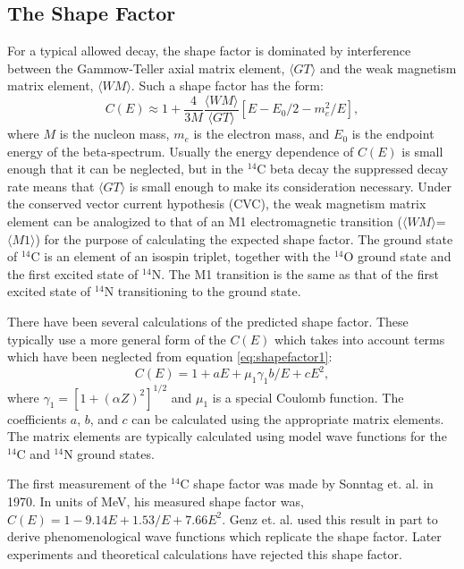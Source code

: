 \subsection{The Shape Factor}\label{sec:shape_factor}
For a typical allowed decay, the shape factor is dominated by interference between the Gammow-Teller axial matrix element, $\langle GT \rangle$ and the weak magnetism matrix element, $\langle WM \rangle$. Such a shape factor has the form\cite{C14_Kuzminov,C14_Garcia,C14_Wietfeldt,beta_Calaprice}:
\begin{equation}\label{eq:shapefactor1}
C(E)\approx1+\frac{4}{3M}\frac{\langle WM \rangle}{\langle GT \rangle}[E-E_0/2-m_e^2/E],
\end{equation}
where $M$ is the nucleon mass, $m_e$ is the electron mass, and $E_0$ is the endpoint energy of the beta-spectrum. Usually the energy dependence of $C(E)$ is small enough that it can be neglected, but in the $^{14}$C beta decay the suppressed decay rate means that $\langle GT \rangle$ is small enough to make its consideration necessary. Under the conserved vector current hypothesis (CVC), the weak magnetism matrix element can be analogized to that of an M1 electromagnetic transition ($\langle WM \rangle$=$\langle M1 \rangle$) for the purpose of calculating the expected shape factor. The ground state of $^{14}$C is an element of an isospin triplet, together with the $^{14}$O ground state and the first excited state of $^{14}$N. The M1 transition is the same as that of the first excited state of $^{14}$N transitioning to the ground state.

There have been several calculations of the predicted shape factor\cite{C14_Garcia,C14_Wietfeldt,C14_Genz}. These typically use a more general form of the $C(E)$ which takes into account terms which have been neglected from equation \ref{eq:shapefactor1}:
\begin{equation}\label{eq:shapefactor2}
C(E)=1+aE+\mu_1\gamma_1b/E+cE^2,
\end{equation}
where $\gamma_1=[1+(\alpha Z)^2]^{1/2}$ and $\mu_1$ is a special Coulomb function. The coefficients $a$, $b$, and $c$ can be calculated using the appropriate matrix elements. The matrix elements are typically calculated using model wave functions for the $^{14}$C and $^{14}$N ground states.

The first measurement of the $^{14}$C shape factor was made by Sonntag et. al. in 1970\cite{C14_Sonntag}. In units of MeV, his measured shape factor was, $C(E)=1-9.14E+1.53/E+7.66E^2$. Genz et. al.\cite{C14_Genz} used this result in part to derive phenomenological wave functions which replicate the shape factor. Later experiments and theoretical calculations have rejected this shape factor.

